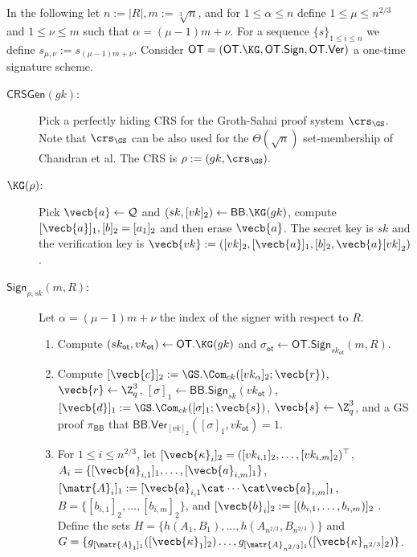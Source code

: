 In the following let $n:=|R|, m:=\sqrt[3]{n}$, and for $1\leq \alpha\leq n$ define $1\leq \mu \leq n^{2/3}$ and $1\leq \nu\leq m$ such that $\alpha=(\mu-1)m+\nu$. For a sequence $\{s\}_{1\leq i\leq n}$ we define $s_{\mu,\nu}:=s_{(\mu-1)m+\nu}$. Consider $\mathsf{OT}=(\mathsf{OT}.\KG,\mathsf{OT}.\mathsf{Sign},\allowbreak\mathsf{OT}.\mathsf{Ver})$ a one-time signature scheme.

\begin{description}
\item[$\mathsf{CRSGen}(gk)$:] Pick a perfectly hiding CRS for the Groth-Sahai proof system $\crs_\GS$. Note that $\crs_\GS$ can be also used for the $\Theta(\sqrt{n})$ set-membership of Chandran et al. The CRS is $\rho:=(gk,\crs_\GS).$

\item[$\KG(\rho)$:] Pick $\vecb{a}\gets\mathcal{Q}$ and $(sk,[vk]_2)\gets\mathsf{BB}.\KG(gk)$, compute $[\vecb{a}]_1,[b]_2=[a_1]_2$ and then erase $\vecb{a}$. The secret key is $sk$ and the verification key is $\vecb{vk}:=([vk]_2,[\vecb{a}]_1,[b]_2,\vecb{a}[vk]_2)$.

\item[$\mathsf{Sign}_{\rho,sk}(m,R)$:] Let $\alpha=(\mu-1)m+\nu$ the index of the signer with respect to $R$.
\begin{enumerate}
\item Compute $(sk_\mathsf{ot},vk_\mathsf{ot})\gets\mathsf{OT}.\KG(gk)$ and $\sigma_\mathsf{ot}\gets\allowbreak\mathsf{OT}.\allowbreak\mathsf{Sign}_{sk_\mathsf{ot}}(m,R)$.

\item Compute $[\vecb{c}]_2:=\GS.\Com_{ck}([vk_\alpha]_2;\vecb{r})$, $\vecb{r}\gets\Z_q^3$, $[\sigma]_1\gets\mathsf{BB}.\mathsf{Sign}_{sk}(vk_\mathsf{ot})$, $[\vecb{d}]_1:=\GS.\Com_{ck}([\sigma]_1;\vecb{s})$, $\vecb{s}\gets\Z_q^3$, and a GS proof $\pi_\mathsf{BB}$ that $\mathsf{BB}.\mathsf{Ver}_{[vk]_2}(\allowbreak[\sigma]_1,vk_\mathsf{ot})=1$.

\item For $1\leq i \leq n^{2/3}$, let $[\vecb{\kappa}_i]_2=([vk_{i,1}]_2,\ldots,[vk_{i,m}]_2)^\top$, $A_i=\{[\vecb{a}_{i,1}]_1,\allowbreak\ldots,\allowbreak[\vecb{a}_{i,m}]_1\}$,  $[\matr{A}_i]_1:=[\vecb{a}_{i,1}\cat\cdots\cat\vecb{a}_{i,m}]_1$, $B=\{[b_{i,1}]_2,\ldots,[b_{i,m}]_2\}$, and $[\vecb{b}_i]_2:=[(b_{i,1},\ldots,b_{i,m})]_2$ . Define the sets
$H=\{h(A_1,B_1),\allowbreak\ldots,\allowbreak h(A_{n^{2/3}},B_{n^{2/3}})\}$ and
$G=\{
	g_{[\matr{A}_1]_1}([\vecb{\kappa}_1]_2)
	\allowbreak\ldots,\allowbreak
	g_{[\matr{A}_{n^{2/3}}]_1}([\vecb{\kappa}_{n^{2/3}}]_2)\}$.


\end{enumerate}
\end{description}

